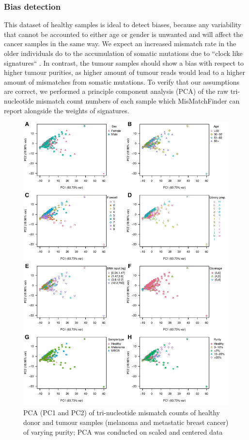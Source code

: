 \subsubsection{Bias detection}
\label{mmf-sec:healthyBias}
This dataset of healthy samples is ideal to detect biases, because any variability that cannot be accounted to either age or gender is unwanted and will affect the cancer samples in the same way. We expect an increased mismatch rate in the older individuals do to the accumulation of somatic mutations due to ``clock like signatures`` \cite{Abascal2021}. In contrast, the tumour samples should show a bias with respect to higher tumour purities, as higher amount of tumour reads would lead to a higher amount of mismatches from somatic mutations.
To verify that our assumptions are correct, we performed a principle component analysis (PCA) of the raw tri-nucleotide mismatch count numbers of each sample which MisMatchFinder can report alongside the weights of signatures.

\begin{figure}[!ht]
\centering
\includegraphics[width=.99\linewidth]{Figures/countPCAsPC1vsPC2.pdf}
\caption[PCA of tri-nucleotide mismatch counts of real world data (PC1 and PC2)]{PCA (PC1 and PC2) of tri-nucleotide mismatch counts of healthy donor and tumour samples (melanoma and metastatic breast cancer) of varying purity; PCA was conducted on scaled and centered data}\label{fig:mmf-pca1v2}
\end{figure}

